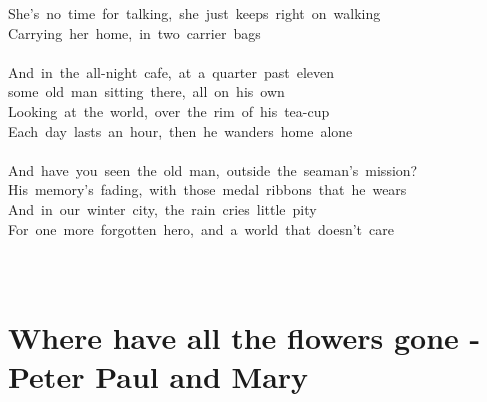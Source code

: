 \documentclass[]{book}
\let\stdsection\section
\renewcommand\section{\clearpage\stdsection}
\begin{document}
She's~no~time~for~talking,~she~just~keeps~right~on~walking\\
Carrying~her~home,~in~two~carrier~bags\\
~\\
And~in~the~all-night~cafe,~at~a~quarter~past~eleven\\
some~old~man~sitting~there,~all~on~his~own\\
Looking~at~the~world,~over~the~rim~of~his~tea-cup\\
Each~day~lasts~an~hour,~then~he~wanders~home~alone\\
~\\
And~have~you~seen~the~old~man,~outside~the~seaman's~mission?\\
His~memory's~fading,~with~those~medal~ribbons~that~he~wears\\
And~in~our~winter~city,~the~rain~cries~little~pity\\
For~one~more~forgotten~hero,~and~a~world~that~doesn't~care\\
~\\
~\\

\hypertarget{where-have-all-the-flowers-gone---peter-paul-and-mary}{%
\section{Where have all the flowers gone - Peter Paul and Mary}\label{where-have-all-the-flowers-gone---peter-paul-and-mary}}
\end{document}
